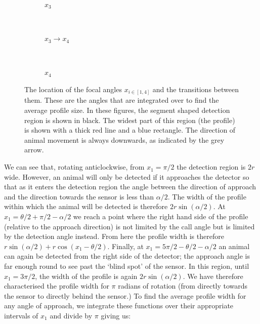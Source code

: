 \documentclass[a4paper,10pt,reqno,oneside]{amsart}
\begin{document}
\begin{figure}[t]
	\begin{subfigure}[t]{0.22\textwidth}
                \centering
                \caption{$x_3$}
                \label{f:x3}
        \end{subfigure}%
	~
	\begin{subfigure}[t]{0.22\textwidth}
                \centering
                \caption{$x_3 \rightarrow x_4$}
                \label{f:x4}
        \end{subfigure}%
	~ 
	\begin{subfigure}[t]{0.22\textwidth}
                \centering
                \caption{$x_4$}
                \label{f:x4}
        \end{subfigure}%
\caption{The location of the focal angles $x_{i\in[1,4]}$ and the transitions between them. These are the angles that are integrated over to find the average profile size. In these figures, the segment shaped detection region is shown in black. The widest part of this region (the profile) is shown with a thick red line and a blue rectangle. The direction of animal movement is always downwards, as indicated by the grey arrow.}
\label{f:xis}
\end{figure}

We can see that, rotating anticlockwise, from $x_1  = \pi/2$ the detection region is $2r$ wide. However, an animal will only be detected if it approaches the detector so that as it enters the detection region the angle between the direction of approach and the direction towards the sensor is less than $\alpha/2$. The width of the profile within which the animal will be detected is therefore $2r\sin(\alpha/2)$. At $x_1  = \theta/2 + \pi/2 - \alpha/2$ we reach a point where the right hand side of the profile (relative to the approach direction) is not limited by the call angle but is limited by the detection angle instead. From here the profile width is therefore $r\sin( \alpha/2) + r\cos( x_1  - \theta/2)$. Finally, at $x_1  = 5\pi/2 - \theta/2  - \alpha/2$ an animal can again be detected from the right side of the detector; the approach angle is far enough round to see past the `blind spot' of the sensor. In this region, until $x_1  = 3\pi/2$, the width of the profile is again $2r\sin( \alpha/2)$. We have therefore characterised the profile width for $\pi$ radians of rotation (from directly towards the sensor to directly behind the sensor.) To find the average profile width for any angle of approach, we integrate these functions over their appropriate intervals of $x_1 $ and divide by $\pi$ giving us:
\end{document}
